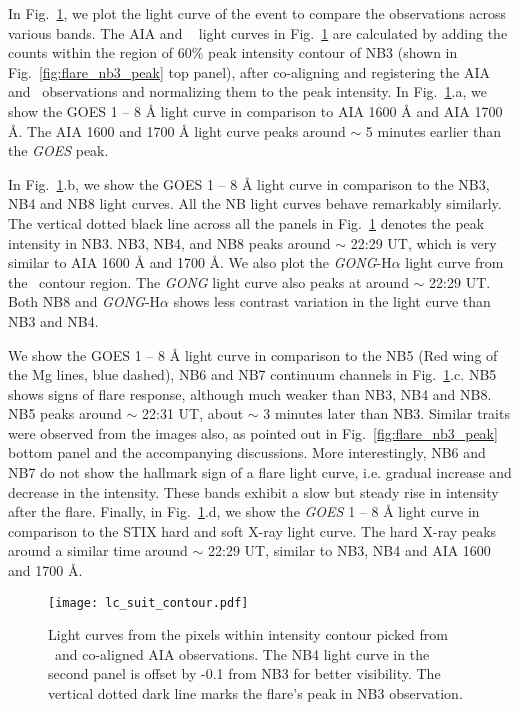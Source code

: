 In Fig.~\ref{fig:flare_lc_suit}, we plot the light curve of the event to compare the observations across various bands. The AIA and \suit~ light curves in Fig.~\ref{fig:flare_lc_suit} are calculated by adding the counts within the region of 60\% peak intensity contour of NB3 (shown in Fig.~\ref{fig:flare_nb3_peak} top panel), after co-aligning and registering the AIA and \suit~observations and normalizing them to the peak intensity. In Fig.~\ref{fig:flare_lc_suit}.a, we show the GOES 1 {--} 8 {\AA} light curve in comparison to AIA 1600 {\AA} and AIA 1700 {\AA}. The AIA 1600 and 1700 {\AA} light curve peaks around $\sim$ 5 minutes earlier than the {\it GOES} peak. 

In Fig.~\ref{fig:flare_lc_suit}.b, we show the GOES 1 {--} 8 {\AA} light curve in comparison to the NB3, NB4 and NB8 light curves. All the NB light curves behave remarkably similarly. The vertical dotted black line across all the panels in Fig.~\ref{fig:flare_lc_suit} denotes the peak intensity in NB3. NB3, NB4, and NB8 peaks around $\sim$ 22:29 UT, which is very similar to AIA 1600 {\AA} and 1700 {\AA}. We also plot the {\it GONG}-H$\alpha$ light curve from the \suit~contour region. The {\it GONG} light curve also peaks at around $\sim$ 22:29 UT. Both NB8 and {\it GONG}-H$\alpha$ shows less contrast variation in the light curve than NB3 and NB4.

We show the GOES 1 {--} 8 {\AA} light curve in comparison to the NB5 (Red wing of the Mg lines, blue dashed), NB6 and NB7 continuum channels in Fig.~\ref{fig:flare_lc_suit}.c. NB5 shows signs of flare response, although much weaker than NB3, NB4 and NB8. NB5 peaks around $\sim$ 22:31 UT, about $\sim$ 3 minutes later than NB3. Similar traits were observed from the images also, as pointed out in Fig.~\ref{fig:flare_nb3_peak} bottom panel and the accompanying discussions. More interestingly, NB6 and NB7 do not show the hallmark sign of a flare light curve, i.e. gradual increase and decrease in the intensity. These bands exhibit a slow but steady rise in intensity after the flare. Finally, in Fig.~\ref{fig:flare_lc_suit}.d, we show the {\it GOES} 1 {--} 8 {\AA} light curve in comparison to the STIX hard and soft X-ray light curve. The hard X-ray peaks around a similar time around $\sim$ 22:29 UT, similar to NB3, NB4 and AIA 1600 and 1700 {\AA}.

\begin{figure}[ht!]
    \centering
    \texttt{[image: lc\_suit\_contour.pdf]}
    \caption{Light curves from the pixels within intensity contour picked from \suit~and co-aligned AIA observations. The NB4 light curve in the second panel is offset by -0.1 from NB3 for better visibility. The vertical dotted dark line marks the flare's peak in NB3 observation.}
    \label{fig:flare_lc_suit}
\end{figure}

